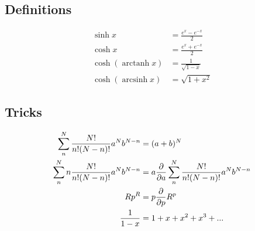 \documentclass[a4paper, norsk, 8pt]{article}
\DeclareMathOperator{\arcsinh}{arcsinh}
\DeclareMathOperator{\arctanh}{arctanh}
\begin{document}
\begin{multicols*}{3}
\subsection*{\footnotesize  Definitions}

\begin{align*}
  \sinh{x} &= \frac{e^{x}-e^{-x}}{2} \\
  \cosh{x} &= \frac{e^{x}+e^{-x}}{2} \\
  \cosh{\left( \arctanh{x} \right)} &= \frac{1}{\sqrt{1-x}} \\
  \cosh{\left( \arcsinh{x} \right)} &= \sqrt{1+x^2}
\end{align*}

\subsection*{\footnotesize  Tricks}
\begin{align*}
  \sum_{n}^{N} \frac{N!}{n!(N-n)!}a^Nb^{N-n} &= (a+b)^N \\
  \sum_{n}^{N} n\frac{N!}{n!(N-n)!}a^Nb^{N-n} &= a\pdv{}{a}\sum_{n}^{N} \frac{N!}{n!(N-n)!}a^Nb^{N-n} \\
  Rp^{R} &= p \pdv{}{p}R^{p} \\
  \frac{1}{1-x} &= 1 + x + x^2 + x^3 +...
\end{align*}

\end{multicols*}
\end{document}
